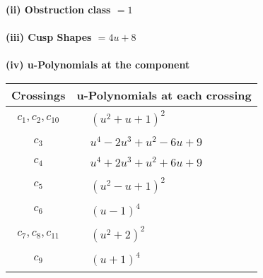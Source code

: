 \documentclass[1p]{elsarticle_modified}
\theoremstyle{definition}
\begin{document}
\flushleft \textbf{(ii) Obstruction class $= 1$}\\~\\
\flushleft \textbf{(iii) Cusp Shapes $= 4 u+8$}\\~\\
\newpage\renewcommand{\arraystretch}{1}
\flushleft \textbf{(iv) u-Polynomials at the component}\newline \\
\begin{tabular}{m{50pt}|m{274pt}}
Crossings & \hspace{64pt}u-Polynomials at each crossing \\
\hline $$\begin{aligned}c_{1},c_{2},c_{10}\end{aligned}$$&$\begin{aligned}
&(u^2+u+1)^2
\end{aligned}$\\
\hline $$\begin{aligned}c_{3}\end{aligned}$$&$\begin{aligned}
&u^4-2 u^3+u^2-6 u+9
\end{aligned}$\\
\hline $$\begin{aligned}c_{4}\end{aligned}$$&$\begin{aligned}
&u^4+2 u^3+u^2+6 u+9
\end{aligned}$\\
\hline $$\begin{aligned}c_{5}\end{aligned}$$&$\begin{aligned}
&(u^2- u+1)^2
\end{aligned}$\\
\hline $$\begin{aligned}c_{6}\end{aligned}$$&$\begin{aligned}
&(u-1)^4
\end{aligned}$\\
\hline $$\begin{aligned}c_{7},c_{8},c_{11}\end{aligned}$$&$\begin{aligned}
&(u^2+2)^2
\end{aligned}$\\
\hline $$\begin{aligned}c_{9}\end{aligned}$$&$\begin{aligned}
&(u+1)^4
\end{aligned}$\\
\hline
\end{tabular}\\~\\
\end{document}
